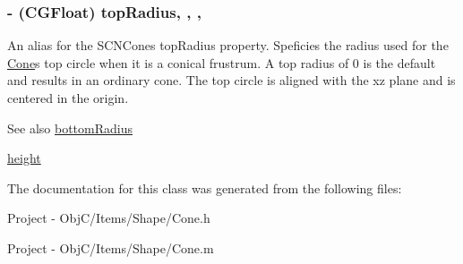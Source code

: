 \subsubsection[{top\+Radius}]{\setlength{\rightskip}{0pt plus 5cm}-\/ (C\+G\+Float) top\+Radius\hspace{0.3cm}{\ttfamily [read]}, {\ttfamily [write]}, {\ttfamily [nonatomic]}, {\ttfamily [assign]}}\label{interface_cone_a0050c318410d187cadee5a4dce2087f3}
An alias for the S\+C\+N\+Cone\textquotesingle{}s {\ttfamily top\+Radius} property. Speficies the radius used for the \hyperlink{interface_cone}{Cone}\textquotesingle{}s top circle when it is a conical frustrum. A top radius of 0 is the default and results in an ordinary cone. The top circle is aligned with the {\ttfamily xz} plane and is centered in the origin. \begin{DoxySeeAlso}{See also}
\hyperlink{interface_cone_a4c9e65faf1500b1bac399f0213318bd1}{bottom\+Radius} 

\hyperlink{interface_cone_ae423d684792ea4632334f06cb3c26fa4}{height} 
\end{DoxySeeAlso}


The documentation for this class was generated from the following files\+:\begin{DoxyCompactItemize}
\item 
Project -\/ Obj\+C/\+Items/\+Shape/Cone.\+h\item 
Project -\/ Obj\+C/\+Items/\+Shape/Cone.\+m\end{DoxyCompactItemize}
